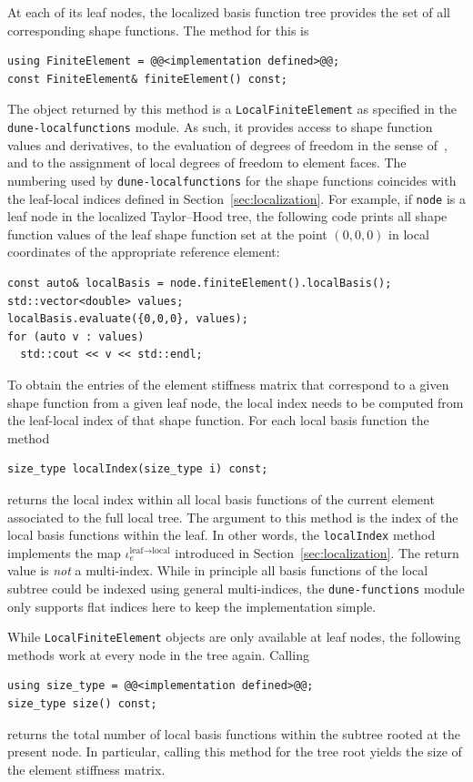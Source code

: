 \documentclass[a4paper,10pt,headings=normal,bibliography=totoc]{scrartcl}
\newcommand{\cpp}[1]{\lstinline[basicstyle=\ttfamily]!#1!}
\newcommand{\dunemodule}[1]{\texttt{#1}}
\begin{document}
At each of its leaf nodes, the localized basis function tree provides the set
of all corresponding shape functions.
The method for this is
\begin{lstlisting}[style=Interface]
using FiniteElement = @@<implementation defined>@@;
const FiniteElement& finiteElement() const;
\end{lstlisting}
The object returned by this method is a \cpp{LocalFiniteElement} as specified
in the \dunemodule{dune-localfunctions} module. As such, it provides access
to shape function values and derivatives, to the evaluation of degrees of freedom
in the sense of~\cite{ciarlet:1978}, and to the assignment of local degrees of
freedom to element faces.
The numbering used by \dunemodule{dune-localfunctions} for the shape functions
coincides with the leaf-local indices defined in Section~\ref{sec:localization}.
For example, if \cpp{node} is a leaf node in the localized Taylor--Hood tree,
the following code prints all shape function values of the leaf shape function set
at the point $(0,0,0)$ in local coordinates of the appropriate reference element:
%
\begin{lstlisting}[style=Example]
const auto& localBasis = node.finiteElement().localBasis();
std::vector<double> values;
localBasis.evaluate({0,0,0}, values);
for (auto v : values)
  std::cout << v << std::endl;
\end{lstlisting}
%

To obtain the entries of the element stiffness matrix that correspond to a
given shape function from a given leaf node, the local index needs to be computed
from the leaf-local index of that shape function.
For each local basis function the method
\begin{lstlisting}[style=Interface]
size_type localIndex(size_type i) const;
\end{lstlisting}
returns the
local index within all local basis functions of the current element associated to the full
local tree.
The argument to this method is the
index of the local basis functions within the leaf.
In other words, the \cpp{localIndex} method
implements the map $\iota^{\text{leaf}\to\text{local}}_e$
introduced in Section~\ref{sec:localization}.
The return value is \emph{not} a multi-index.
While in principle all basis functions of the local subtree could be indexed using
general multi-indices, the \dunemodule{dune-functions} module only supports
flat indices here to keep the implementation simple.

While \cpp{LocalFiniteElement} objects are only available at leaf nodes,
the following methods work at every node in the tree again.
Calling
\begin{lstlisting}[style=Interface]
using size_type = @@<implementation defined>@@;
size_type size() const;
\end{lstlisting}
returns the total number of
local basis functions within the subtree rooted at the
present node.  In particular, calling this method for the tree root
yields the size of the element stiffness matrix.
\end{document}
